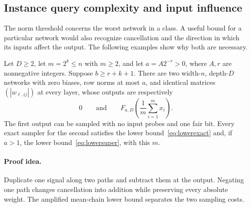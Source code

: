 \subsection{Instance query complexity and input influence}\label{sec:instance}

The norm threshold concerns the worst network in a class. A useful
bound for a particular network would also recognize cancellation and
the direction in which its inputs affect the output.  The following
examples show why both are necessary.

\begin{proposition}
\label{prop:magnitude-obstruction}
Let \(D\ge2\), let \(m=2^k\le n\) with \(m\ge2\), and let
\(a=A2^{-r}>0\), where \(A,r\) are nonnegative integers.  Suppose
\(b\ge r+k+1\).  There are two width-\(n\), depth-\(D\) networks
with zero biases, row norms at most \(a\), and identical matrices
\((|w_{\ell,ij}|)\) at every layer, whose outputs are respectively
\[
  0\qquad\text{and}\qquad
  F_{a,D}\left(\frac1m\sum_{i=1}^m x_i\right).
\]
The first output can be sampled with no input probes and one fair bit.
Every exact sampler for the second satisfies the lower
bound~\eqref{eq:lowerexact} and, if \(a>1\), the lower
bound~\eqref{eq:lowersuper}, with this \(m\).
\end{proposition}

\paragraph{Proof idea.}
Duplicate one signal along two paths and subtract them at the
output. Negating one path changes cancellation into addition while preserving
every absolute weight. The amplified mean-chain lower bound separates the
two sampling costs.

